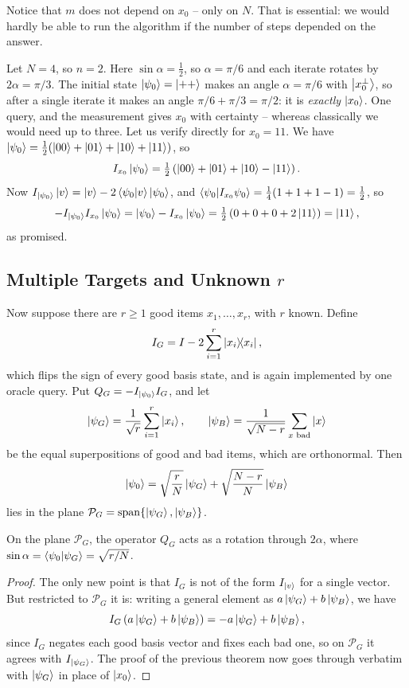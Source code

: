 \documentclass[a4paper]{scrartcl}
\newcommand{\Ps}{\mathcal{P}}
\begin{document}
Notice that $m$ does not depend on $x_0$ -- only on $N$. That is essential: we would hardly be able to run the algorithm if the number of steps depended on the answer.

\begin{example}
	Let $N = 4$, so $n = 2$. Here $\sin\alpha = \tfrac12$, so $\alpha = \pi/6$ and each iterate rotates by $2\alpha = \pi/3$. The initial state $\ket{\psi_0} = \ket{++}$ makes an angle $\alpha = \pi/6$ with $\ket{x_0^\perp}$, so after a single iterate it makes an angle $\pi/6+\pi/3 = \pi/2$: it is \emph{exactly} $\ket{x_0}$. One query, and the measurement gives $x_0$ with certainty -- whereas classically we would need up to three. Let us verify directly for $x_0 = 11$. We have $\ket{\psi_0} = \tfrac12(\ket{00}+\ket{01}+\ket{10}+\ket{11})$, so
	$$I_{x_0}\ket{\psi_0} = \tfrac12\left(\ket{00}+\ket{01}+\ket{10}-\ket{11}\right).$$
	Now $I_{\ket{\psi_0}}\ket v = \ket v - 2\ip{\psi_0}{v}\ket{\psi_0}$, and $\ip{\psi_0}{I_{x_0}\psi_0} = \tfrac14(1+1+1-1) = \tfrac12$, so
	$$-I_{\ket{\psi_0}}I_{x_0}\ket{\psi_0} = \ket{\psi_0} - I_{x_0}\ket{\psi_0} = \tfrac12\left(0+0+0+2\ket{11}\right) = \ket{11},$$
	as promised.
\end{example}

\subsection{Multiple Targets and Unknown \texorpdfstring{$r$}{r}}

Now suppose there are $r\geq1$ good items $x_1,\dots,x_r$, with $r$ known. Define
$$I_G = I - 2\sum_{i=1}^r\op{x_i}{x_i},$$
which flips the sign of every good basis state, and is again implemented by one oracle query. Put $Q_G = -I_{\ket{\psi_0}}I_G$, and let
$$\ket{\psi_G} = \frac1{\sqrt r}\sum_{i=1}^r\ket{x_i}, \qquad \ket{\psi_B} = \frac1{\sqrt{N-r}}\sum_{x \text{ bad}}\ket x$$
be the equal superpositions of good and bad items, which are orthonormal. Then
$$\ket{\psi_0} = \sqrt{\frac rN}\ket{\psi_G}+\sqrt{\frac{N-r}{N}}\ket{\psi_B}$$
lies in the plane $\Ps_G = \vecspan\{\ket{\psi_G},\ket{\psi_B}\}$.

\begin{proposition}
	On the plane $\Ps_G$, the operator $Q_G$ acts as a rotation through $2\alpha$, where $\sin\alpha = \ip{\psi_0}{\psi_G} = \sqrt{r/N}$.
\end{proposition}

\begin{proof}
	The only new point is that $I_G$ is not of the form $I_{\ket v}$ for a single vector. But restricted to $\Ps_G$ it is: writing a general element as $a\ket{\psi_G}+b\ket{\psi_B}$, we have
	$$I_G\left(a\ket{\psi_G}+b\ket{\psi_B}\right) = -a\ket{\psi_G}+b\ket{\psi_B},$$
	since $I_G$ negates each good basis vector and fixes each bad one, so on $\Ps_G$ it agrees with $I_{\ket{\psi_G}}$. The proof of the previous theorem now goes through verbatim with $\ket{\psi_G}$ in place of $\ket{x_0}$.
\end{proof}
\end{document}
